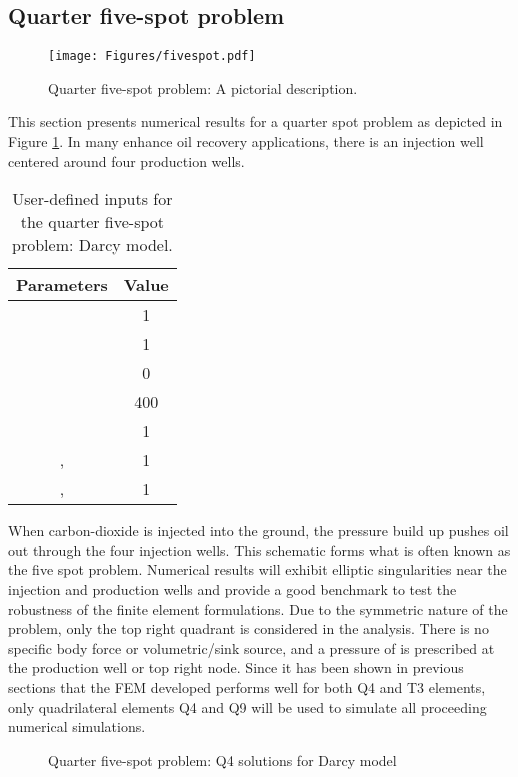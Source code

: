 \documentclass[11pt,reqno]{amsart}
\begin{document}
\subsection{Quarter five-spot problem}
\begin{figure}[t!]
  \centering
  \texttt{[image: Figures/fivespot.pdf]}
  \caption{Quarter five-spot problem: A pictorial description.}
  \label{Fig:fivespot}
\end{figure}
This section presents numerical results for a quarter 
spot problem as depicted in Figure \ref{Fig:fivespot}. 
In many enhance oil recovery applications, there is an 
injection well centered around four production wells. 
\begin{table}[b!]
  \centering
  \caption{User-defined inputs for the quarter five-spot problem: Darcy model.}
  \begin{tabular}{cc}
    \hline
    Parameters & Value \\
    \hline
     & 1 \\
     & 1 \\
     & 0 \\
     & 400 \\
     & 1 \\
    ,  & 1 \\
    ,  & 1 \\
    \hline
  \end{tabular}
  \label{Tab:quarter_spot}
\end{table}
When carbon-dioxide is injected into the ground, the pressure build up pushes oil out through the four
injection wells. This schematic forms what is often known as the five spot problem. Numerical results will 
exhibit elliptic singularities near the injection and production wells and provide a good benchmark to test 
the robustness of the finite element formulations. Due to the symmetric nature of the problem, only the top 
right quadrant is considered in the analysis. There is no specific body force or volumetric/sink source, and 
a pressure of  is prescribed at the production well or top right node.
Since it has been shown in previous sections that the FEM developed performs well for both Q4 and T3 elements, 
only quadrilateral elements Q4 and Q9 will be used to simulate all proceeding numerical simulations.
\begin{figure}[t!]
  \centering
  \label{Fig:Quarter_spot_Q4_quiver}
  \caption{Quarter five-spot problem: Q4 solutions for Darcy model}
  \label{Fig:Quarter_spot_Q4_D}
\end{figure}
\end{document}
